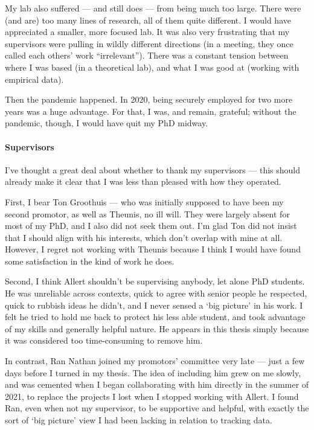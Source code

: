 My lab also suffered --- and still does --- from being much too large. 
There were (and are) too many lines of research, all of them quite different.
I would have appreciated a smaller, more focused lab.
It was also very frustrating that my supervisors were pulling in wildly different directions (in a meeting, they once called each others' work ``irrelevant'').
There was a constant tension between where I was based (in a theoretical lab), and what I was good at (working with empirical data).

Then the pandemic happened.
In 2020, being securely employed for two more years was a huge advantage.
For that, I was, and remain, grateful; without the pandemic, though, I would have quit my PhD midway.

\paragraph*{Supervisors}

I've thought a great deal about whether to thank my supervisors --- this should already make it clear that I was less than pleased with how they operated.

First, I bear Ton Groothuis --- who was initially supposed to have been my second promotor, as well as Theunis, no ill will.
They were largely absent for most of my PhD, and I also did not seek them out.
I'm glad Ton did not insist that I should align with his interests, which don't overlap with mine at all.
However, I regret not working with Theunis because I think I would have found some satisfaction in the kind of work he does.

Second, I think Allert shouldn't be supervising anybody, let alone PhD students.
He was unreliable across contexts, quick to agree with senior people he respected, quick to rubbish ideas he didn't, and I never sensed a `big picture' in his work.
I felt he tried to hold me back to protect his less able student, and took advantage of my skills and generally helpful nature.
He appears in this thesis simply because it was considered too time-consuming to remove him.

In contrast, Ran Nathan joined my promotors' committee very late --- just a few days before I turned in my thesis.
The idea of including him grew on me slowly, and was cemented when I began collaborating with him directly in the summer of 2021, to replace the projects I lost when I stopped working with Allert.
I found Ran, even when not my supervisor, to be supportive and helpful, with exactly the sort of `big picture' view I had been lacking in relation to tracking data.

